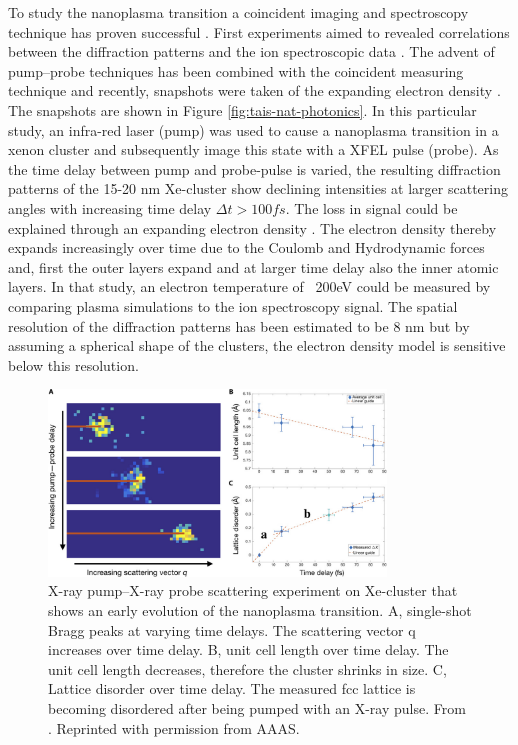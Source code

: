 To study the nanoplasma transition a coincident imaging and spectroscopy technique has proven successful \citep{Bostedt-2012-PRL}. First experiments aimed to revealed correlations between the diffraction patterns and the ion spectroscopic data \citep{Gorkhover-2012-PRL,Rupp-2016-PRL}. The advent of pump--probe techniques has been combined with the coincident measuring technique and recently, snapshots were taken of the expanding electron density \citep{Gorkhover-2016-NatPho}. The snapshots are shown in Figure \ref{fig:tais-nat-photonics}. In this particular study, an infra-red laser (pump) was used to cause a nanoplasma transition in a xenon cluster and subsequently image this state with a XFEL pulse (probe). As the time delay between pump and probe-pulse is varied, the resulting diffraction patterns of the 15-20 nm Xe-cluster show declining intensities at larger scattering angles with increasing time delay $\Delta t>100 fs$. The loss in signal could be explained through an expanding electron density \citep{Hau-Riege-2008-PRE,Peltz-2014-PRL}. The electron density thereby expands increasingly over time due to the Coulomb and Hydrodynamic forces and, first the outer layers expand and at larger time delay also the inner atomic layers. In that study, an electron temperature of ~200eV could be measured by comparing plasma simulations to the ion spectroscopy signal. The spatial resolution of the diffraction patterns has been estimated to be 8 nm but by assuming a spherical shape of the clusters, the electron density model is sensitive below this resolution.\\
\begin{figure}
	\centering
		\includegraphics[width=0.80\textwidth]{images/ken-science.jpg}
	\caption[Experiment that shows early evolution of the nanoplasma transition.]{X-ray pump--X-ray probe scattering experiment on Xe-cluster that shows an early evolution of the nanoplasma transition. A, single-shot Bragg peaks at varying time delays. The scattering vector q increases over time delay. B, unit cell length over time delay. The unit cell length decreases, therefore the cluster shrinks in size. C, Lattice disorder over time delay. The measured fcc lattice is becoming disordered after being pumped with an X-ray pulse. From \citep{Ferguson-2016-SciAdv}. Reprinted with permission from AAAS.}
	\label{fig:ken-science}
\end{figure}

